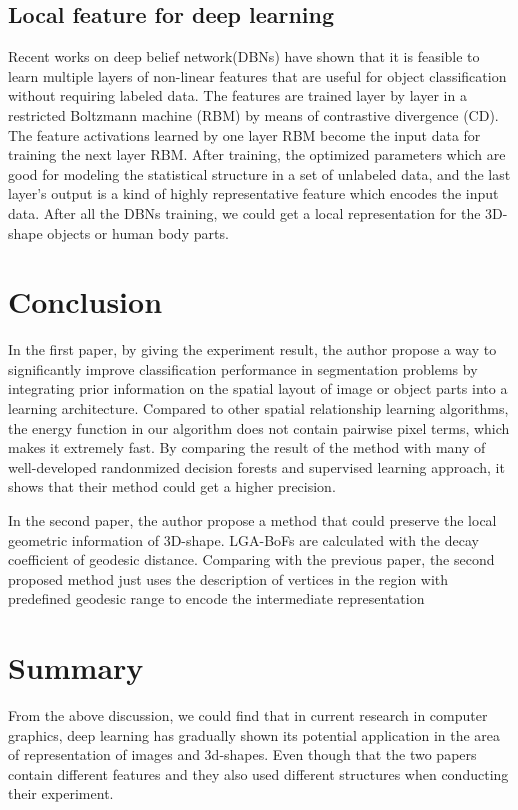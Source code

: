 \documentclass[pdftex,12pt,a4paper]{article}
\begin{document}
\subsection{Local feature for deep learning}
Recent works on deep belief network(DBNs) have shown that it is feasible to learn multiple layers of non-linear features that are useful for object classification without requiring labeled data. The features are trained layer by layer in a restricted Boltzmann machine (RBM) by means of contrastive divergence (CD). The feature activations learned by one layer RBM become the input data for training the next layer RBM. After training, the optimized parameters which are good for modeling the statistical structure in a set of unlabeled data, and the last layer's output is a kind of highly representative feature which encodes the input data. After all the DBNs training, we could get a local representation for the 3D-shape objects or human body parts.

\section{Conclusion}
In the first paper, by giving the experiment result, the author propose a way to significantly improve classification performance in segmentation problems by integrating prior information on the spatial layout of image or object parts into a learning architecture. Compared to other spatial relationship learning algorithms, the energy function in our algorithm does not contain pairwise pixel terms, which makes it extremely fast. By comparing the result of the method with many of well-developed randonmized decision forests and supervised learning approach, it shows that their method could get a higher precision.

In the second paper, the author propose a method that could preserve the local geometric information of 3D-shape. LGA-BoFs are calculated with the decay coefficient of geodesic distance. Comparing with the previous paper, the second proposed method just uses the description of vertices in the region with predefined geodesic range to encode the intermediate representation


\section{Summary}
From the above discussion, we could find that in current research in computer graphics, deep learning has gradually shown its potential application in the area of representation of images and 3d-shapes. Even though that the two papers contain different features and they also used different structures when conducting their experiment.
\end{document}
